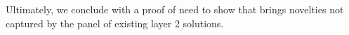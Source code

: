 


Ultimately, we conclude with a proof of need to show that {\projectName} brings novelties not captured by the panel of existing layer 2 solutions.

